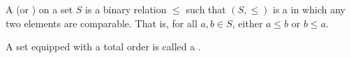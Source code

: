 \begin{definition} \label{definition:total_order_on_a_set}
A  (or ) on a set $S$ is a binary relation $\leq$ such that $(S, \leq)$ is a  in which any two elements are comparable. That is, for all $a, b \in S$, either $a \leq b$ or $b \leq a$.

A set equipped with a total order is called a . 

\end{definition}
